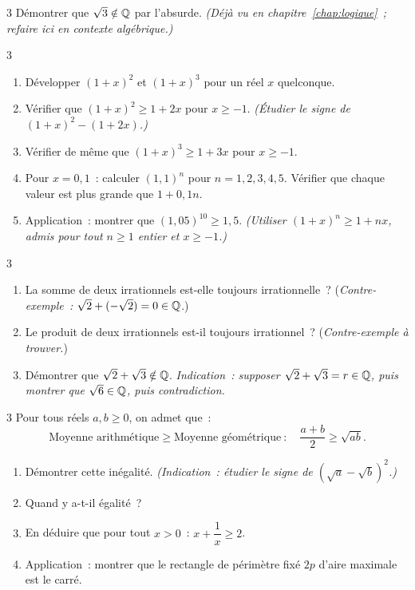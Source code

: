 \begin{exo}{3}
D\'emontrer que $\sqrt{3}\notin\mathbb{Q}$ par l'absurde.
\emph{(D\'ej\`a vu en chapitre~\ref{chap:logique}~; refaire ici en contexte alg\'ebrique.)}
\end{exo}

\begin{exo}{3}
\begin{enumerate}
  \item D\'evelopper $(1+x)^2$ et $(1+x)^3$ pour un r\'eel $x$ quelconque.
  \item V\'erifier que $(1+x)^2 \geq 1 + 2x$ pour $x \geq -1$.
        \emph{(\'Etudier le signe de $(1+x)^2 - (1+2x)$.)}
  \item V\'erifier de m\^eme que $(1+x)^3 \geq 1 + 3x$ pour $x \geq -1$.
  \item Pour $x = 0{,}1$~: calculer $(1{,}1)^n$ pour $n = 1,2,3,4,5$.
        V\'erifier que chaque valeur est plus grande que $1 + 0{,}1n$.
  \item Application~: montrer que $(1{,}05)^{10} \geq 1{,}5$.
        \emph{(Utiliser $(1+x)^n \geq 1+nx$, admis pour tout
        $n \geq 1$ entier et $x \geq -1$.)}
\end{enumerate}
\end{exo}

\begin{exo}{3}
\begin{enumerate}
  \item La somme de deux irrationnels est-elle toujours irrationnelle~?
        (\emph{Contre-exemple~:} $\sqrt{2} + (-\sqrt{2}) = 0 \in \mathbb{Q}$.)
  \item Le produit de deux irrationnels est-il toujours irrationnel~?
        (\emph{Contre-exemple \`a trouver.})
  \item D\'emontrer que $\sqrt{2}+\sqrt{3}\notin\mathbb{Q}$.
        \emph{Indication~: supposer $\sqrt{2}+\sqrt{3} = r \in \mathbb{Q}$,
        puis montrer que $\sqrt{6} \in \mathbb{Q}$, puis contradiction.}
\end{enumerate}
\end{exo}

\begin{exo}{3}
Pour tous r\'eels $a, b \geq 0$, on admet que~:
$$\text{Moyenne arithm\'etique} \geq \text{Moyenne g\'eom\'etrique}~:
\quad\frac{a+b}{2} \geq \sqrt{ab}.$$
\begin{enumerate}
  \item D\'emontrer cette in\'egalit\'e.
        \emph{(Indication~: \'etudier le signe de $(\sqrt{a}-\sqrt{b})^2$.)}
  \item Quand y a-t-il \'egalit\'e~?
  \item En d\'eduire que pour tout $x > 0$~:
        $x + \dfrac{1}{x} \geq 2$.
  \item Application~: montrer que le rectangle de p\'erim\`etre fix\'e $2p$
        d'aire maximale est le carr\'e.
\end{enumerate}
\end{exo}

